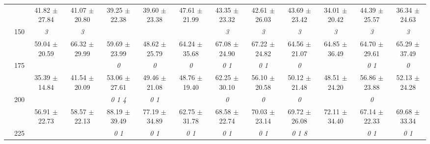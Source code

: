 \begin{table}[h]
{\begin{tabular}{
        ccccccccccccc}
 & & \cellcolor[HTML]{EFEFEF} 41.82 $\pm$ 27.84& \cellcolor[HTML]{EFEFEF} 41.07 $\pm$ 20.80& \cellcolor[HTML]{EFEFEF} 39.25 $\pm$ 22.38& \cellcolor[HTML]{EFEFEF} 39.60 $\pm$ 23.38& \cellcolor[HTML]{EFEFEF} 47.61 $\pm$ 21.99& \cellcolor[HTML]{EFEFEF} 43.35 $\pm$ 23.32& \cellcolor[HTML]{EFEFEF} 42.61 $\pm$ 26.03& \cellcolor[HTML]{EFEFEF} 43.69 $\pm$ 23.42& \cellcolor[HTML]{EFEFEF} 34.01 $\pm$ 20.42& \cellcolor[HTML]{EFEFEF} 44.39 $\pm$ 25.57& \cellcolor[HTML]{EFEFEF} 36.34 $\pm$ 24.63 \\ 
 & \multirow{2}{*}{150}& \textit{ 3 }& \textit{ 3 }& & & & \textit{ 3 }& \textit{ 3 }& \textit{ 3 }& \textit{ 3 }& \textit{ 3 }& \textit{ 3 } \\ 
 & & 59.04 $\pm$ 20.59& 66.32 $\pm$ 29.99& 59.69 $\pm$ 23.99& 48.62 $\pm$ 25.79& 64.24 $\pm$ 35.68& 67.08 $\pm$ 24.90& 67.22 $\pm$ 24.82& 64.56 $\pm$ 21.07& 64.85 $\pm$ 36.49& 64.70 $\pm$ 29.61& 65.29 $\pm$ 37.49 \\ 
 & \multirow{2}{*}{175}& \cellcolor[HTML]{EFEFEF} & \cellcolor[HTML]{EFEFEF} & \cellcolor[HTML]{EFEFEF} \textit{ 0 }& \cellcolor[HTML]{EFEFEF} \textit{ 0 }& \cellcolor[HTML]{EFEFEF} \textit{ 0 }& \cellcolor[HTML]{EFEFEF} \textit{ 0 1 }& \cellcolor[HTML]{EFEFEF} \textit{ 0 1 }& \cellcolor[HTML]{EFEFEF} \textit{ 0 }& \cellcolor[HTML]{EFEFEF} & \cellcolor[HTML]{EFEFEF} \textit{ 0 1 }& \cellcolor[HTML]{EFEFEF} \textit{ 0 } \\ 
 & & \cellcolor[HTML]{EFEFEF} 35.39 $\pm$ 14.84& \cellcolor[HTML]{EFEFEF} 41.54 $\pm$ 20.09& \cellcolor[HTML]{EFEFEF} 53.06 $\pm$ 27.61& \cellcolor[HTML]{EFEFEF} 49.46 $\pm$ 21.08& \cellcolor[HTML]{EFEFEF} 48.76 $\pm$ 19.40& \cellcolor[HTML]{EFEFEF} 62.25 $\pm$ 30.10& \cellcolor[HTML]{EFEFEF} 56.10 $\pm$ 20.58& \cellcolor[HTML]{EFEFEF} 50.12 $\pm$ 21.48& \cellcolor[HTML]{EFEFEF} 48.51 $\pm$ 24.20& \cellcolor[HTML]{EFEFEF} 56.86 $\pm$ 23.88& \cellcolor[HTML]{EFEFEF} 52.13 $\pm$ 24.28 \\ 
 & \multirow{2}{*}{200}& & & \textit{ 0 1 4 }& \textit{ 0 1 }& & \textit{ 0 }& \textit{ 0 }& \textit{ 0 }& & \textit{ 0 }&  \\ 
 & & 56.91 $\pm$ 22.73& 58.57 $\pm$ 22.13& 88.19 $\pm$ 39.49& 77.19 $\pm$ 34.89& 62.75 $\pm$ 31.78& 68.58 $\pm$ 22.74& 70.03 $\pm$ 23.14& 69.72 $\pm$ 26.08& 72.11 $\pm$ 34.40& 67.14 $\pm$ 22.33& 69.68 $\pm$ 33.34 \\ 
 & \multirow{2}{*}{225}& \cellcolor[HTML]{EFEFEF} & \cellcolor[HTML]{EFEFEF} & \cellcolor[HTML]{EFEFEF} \textit{ 0 1 }& \cellcolor[HTML]{EFEFEF} \textit{ 0 1 }& \cellcolor[HTML]{EFEFEF} \textit{ 0 1 }& \cellcolor[HTML]{EFEFEF} \textit{ 0 1 }& \cellcolor[HTML]{EFEFEF} \textit{ 0 1 }& \cellcolor[HTML]{EFEFEF} \textit{ 0 1 8 }& \cellcolor[HTML]{EFEFEF} & \cellcolor[HTML]{EFEFEF} \textit{ 0 1 }& \cellcolor[HTML]{EFEFEF} \textit{ 0 1 } \\ 

\end{tabular}}
\end{table}
